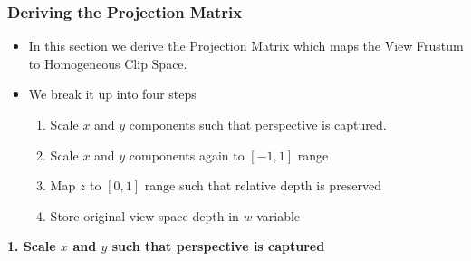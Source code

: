 \documentclass{article}
\begin{document}
\subsubsection{Deriving the Projection Matrix}
\begin{itemize}
	\item In this section we derive the Projection Matrix which maps the View Frustum to Homogeneous Clip Space. %
	\item We break it up into four steps
	\begin{enumerate}
		\item Scale $x$ and $y$ components such that perspective is captured.
		\item Scale $x$ and $y$ components again to $[-1,1]$ range
		\item Map $z$ to $[0,1]$ range such that relative depth is preserved
		\item Store original view space depth in $w$ variable
	\end{enumerate}

\end{itemize}
\textbf{1. Scale $x$ and $y$ such that perspective is captured}
\end{document}
